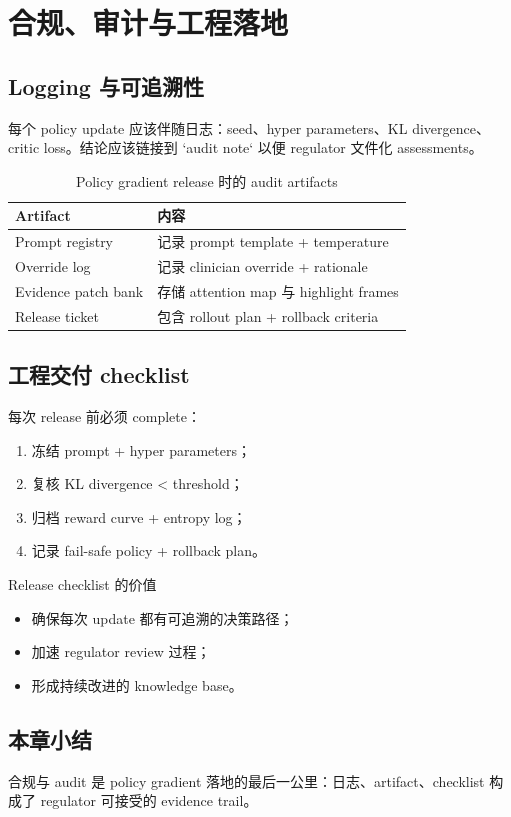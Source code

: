 \section{合规、审计与工程落地}
\subsection{Logging 与可追溯性}
每个 policy update 应该伴随日志：seed、hyper parameters、KL divergence、critic loss。结论应该链接到 `audit note` 以便 regulator 文件化 assessments。

\begin{table}[H]
\centering
\small
\begin{tabular}{p{}p{}}
\toprule
Artifact & 内容 \\
\midrule
Prompt registry & 记录 prompt template + temperature \\
Override log & 记录 clinician override + rationale \\
Evidence patch bank & 存储 attention map 与 highlight frames \\
Release ticket & 包含 rollout plan + rollback criteria \\
\bottomrule
\end{tabular}
\caption{Policy gradient release 时的 audit artifacts}
\end{table}

\subsection{工程交付 checklist}
每次 release 前必须 complete：
\begin{enumerate}
    \item 冻结 prompt + hyper parameters；
    \item 复核 KL divergence < threshold；
    \item 归档 reward curve + entropy log；
    \item 记录 fail-safe policy + rollback plan。
\end{enumerate}

\begin{importantbox}{Release checklist 的价值}
\begin{itemize}
    \item 确保每次 update 都有可追溯的决策路径；
    \item 加速 regulator review 过程；
    \item 形成持续改进的 knowledge base。
\end{itemize}
\end{importantbox}

\subsection{本章小结}
合规与 audit 是 policy gradient 落地的最后一公里：日志、artifact、checklist 构成了 regulator 可接受的 evidence trail。

